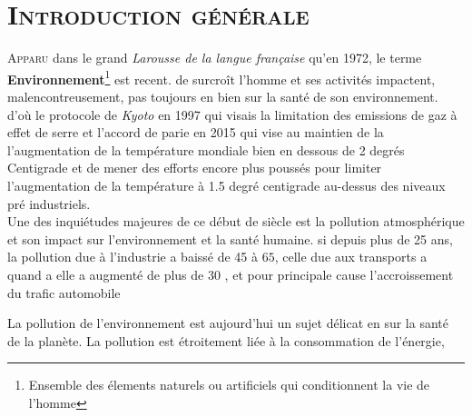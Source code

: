 \chapter*{\textsc{Introduction générale}}
\lettrine{A}{pparu} dans le grand \emph{Larousse de la langue française} qu'en 1972, le terme \textbf{Environnement}\footnote{Ensemble des élements naturels ou artificiels qui conditionnent la vie de l'homme} est recent. de surcroît l'homme et ses activités impactent, malencontreusement,  pas toujours en bien sur la santé de son environnement. d'où le protocole de \emph{Kyoto}  en 1997 qui visais la limitation des emissions de gaz à effet de serre et l'accord de parie en 2015 qui vise au maintien de la l'augmentation de la température mondiale bien en dessous de 2 degrés Centigrade et de mener des efforts encore plus poussés pour limiter l'augmentation de la température à 1.5 degré centigrade au-dessus des niveaux pré industriels.\\

Une des inquiétudes majeures de ce début de siècle est la pollution atmosphérique et son impact sur l’environnement et la santé humaine. si depuis plus de 25 ans, la pollution due à l’industrie a baissé de 45 
à $65$, celle due aux transports a quand a elle a augmenté de plus de 30 , et pour principale cause l'accroissement du trafic automobile


La pollution de l'environnement est aujourd'hui un sujet délicat en  sur la santé de la planète. La pollution est étroitement liée à la consommation de l'énergie,  

